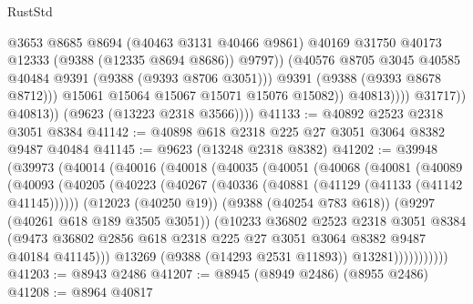 \begin{lexlean}{RustStd}
\begin{coremodule}
                                  @3653
                                  @8685
                                  @8694
                                  (@40463 @3131 @40466 @9861)
                                  @40169
                                  @31750
                                  @40173
                                  @12333
                                  (@9388 (@12335 @8694 @8686))
                                  @9797))
                              (@40576 @8705 @3045 @40585 @40484 @9391 (@9388 (@9393 @8706 @3051)))
                              @9391
                              (@9388 (@9393 @8678 @8712)))
                            @15061
                            @15064
                            @15067
                            @15071
                            @15076
                            @15082))
                        @40813))))
                @31717))
            @40813))
        (@9623 (@13223 @2318 @3566))))
@41133 := @40892 @2523 @2318 @3051 @8384
@41142 := @40898 @618 @2318 @225 @27 @3051 @3064 @8382 @9487 @40484
@41145 := @9623 (@13248 @2318 @8382)
@41202 := @39948
    (@39973
      (@40014
        (@40016
          (@40018
            (@40035
              (@40051
                (@40068
                  (@40081
                    (@40089
                      (@40093
                        (@40205
                          (@40223
                            (@40267 (@40336 (@40881 (@41129 (@41133 (@41142 @41145))))))
                            (@12023 (@40250 @19))
                            (@9388 (@40254 @783 @618))
                            (@9297 (@40261 @618 @189 @3505 @3051))
                            (@10233
                              @36802
                              @2523
                              @2318
                              @3051
                              @8384
                              (@9473
                                @36802
                                @2856
                                @618
                                @2318
                                @225
                                @27
                                @3051
                                @3064
                                @8382
                                @9487
                                @40184
                                @41145)))
                          @13269
                          (@9388 (@14293 @2531 @11893))
                          @13281)))))))))))
@41203 := @8943 @2486
@41207 := @8945 (@8949 @2486) (@8955 @2486)
@41208 := @8964 @40817

\end{coremodule}
\end{lexlean}
